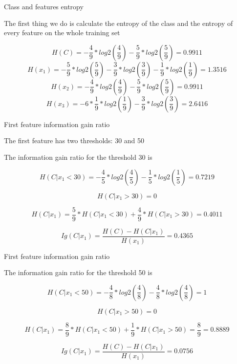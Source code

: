 \begin{frame}{Class and features entropy}
	
	The first thing we do is calculate the entropy of the class and the entropy of every feature on the whole training set
	
	\[
		H(C) = - \frac{4}{9} * log2\left(\frac{4}{9}\right) 
		- \frac{5}{9} * log2\left(\frac{5}{9}\right) = 0.9911
	\]
	\[ 	H(x_1) = - \frac{5}{9} * log2\left(\frac{5}{9}\right)
	- \frac{3}{9} * log2\left(\frac{3}{9}\right)
	- \frac{1}{9} * log2\left(\frac{1}{9}\right) = 1.3516
	\]
	\[ 	H(x_2) = - \frac{4}{9} * log2\left(\frac{4}{9}\right)
	- \frac{5}{9} * log2\left(\frac{5}{9}\right) = 0.9911
	\]
	\[ 	H(x_3) = - 6 * \frac{1}{9} * log2\left(\frac{1}{9}\right)
	- \frac{3}{9} * log2\left(\frac{3}{9}\right) = 2.6416
	\]
	
	
\end{frame}

\begin{frame}{First feature information gain ratio}
	
	The first feature has two thresholds: 30 and 50
	
	The information gain ratio for the threshold 30 is
	
	\[ 
		H(C|x_1 < 30) = - \frac{4}{5} * log2\left(\frac{4}{5}\right) 
		- \frac{1}{5} * log2\left(\frac{1}{5}\right) = 0.7219
	\]
	
	\[ 
		H(C|x_1 > 30) = 0
	 \]
	 
	 \[ 
	 	H(C|x_1) = \frac{5}{9} * H(C|x_1 < 30) + \frac{4}{9} * H(C|x_1 > 30) = 0.4011 
	 \]
	 
	 \[ 
	 	Ig(C|x_1) = \frac{H(C) - H(C|x_1)}{H(x_1)} = 0.4365
	  \]
	
\end{frame}

\begin{frame}{First feature information gain ratio}
	
	The information gain ratio for the threshold 50 is
	
	\[ 
		H(C|x_1 < 50) = - \frac{4}{8} * log2\left(\frac{4}{8}\right) 
		- \frac{4}{8} * log2\left(\frac{4}{8}\right) = 1
	\]
	
	\[ 
		H(C|x_1 > 50) = 0
	\]
	
	\[ 
		H(C|x_1) = \frac{8}{9} * H(C|x_1 < 50) + \frac{1}{9} * H(C|x_1 > 50) = \frac{8}{9}  = 0.8889
	\]
	
	\[ 
		Ig(C|x_1) = \frac{H(C) - H(C|x_1)}{H(x_1)} = 0.0756
	\]
	
\end{frame}

